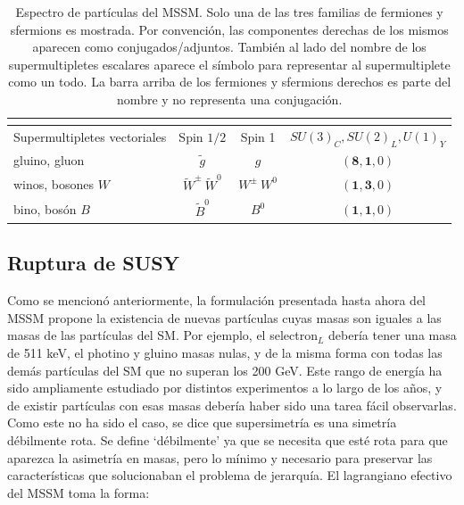 \begin{table}
\begin{tabular}{ l c | c c c}
		\multicolumn{5}{c}{} \\

		\hline

		\multicolumn{2}{l|}{Supermultipletes vectoriales} & Spin $1/2$ & Spin 1 & $SU(3)_C, SU(2)_L, U(1)_Y$ \\

		\hline

		\multicolumn{2}{l|}{gluino, gluon} & $\tilde{g}$ & $g$ & $(\textbf{8}, \textbf{1}, 0)$ \\

		\hline

		\multicolumn{2}{l|}{winos, bosones $W$} & $\widetilde{W}^{\pm}\ \widetilde{W}^{0}$ & $W^{\pm}\ W^0$ & $(\textbf{1}, \textbf{3}, 0)$ \\

		\hline

		\multicolumn{2}{l|}{bino, bosón $B$} & $\widetilde{B}^0$ & $B^0$ & $(\textbf{1}, \textbf{1}, 0)$ \\

	\end{tabular}

	\caption{Espectro de partículas del MSSM. Solo una de las tres familias de fermiones y sfermions es mostrada. Por convención, las componentes derechas de los mismos aparecen como conjugados/adjuntos. También al lado del nombre de los supermultipletes escalares aparece el símbolo para representar al supermultiplete como un todo. La barra arriba de los fermiones y sfermions derechos es parte del nombre y no representa una conjugación. 
	}
	\label{tab:mssm_particles}

\end{table}


\subsection{Ruptura de SUSY}

Como se mencionó anteriormente, la formulación presentada hasta ahora del MSSM propone la existencia de nuevas partículas cuyas masas son iguales a las masas de las partículas del SM. Por ejemplo, el selectron$_L$ debería tener una masa de 511 keV, el photino y gluino masas nulas, y de la misma forma con todas las demás partículas del SM que no superan los 200 GeV. Este rango de energía ha sido ampliamente estudiado por distintos experimentos a lo largo de los años, y de existir partículas con esas masas debería haber sido una tarea fácil observarlas. Como este no ha sido el caso, se dice que supersimetría es una simetría débilmente rota. Se define `débilmente' ya que se necesita que esté rota para que aparezca la asimetría en masas, pero lo mínimo y necesario para preservar las características que solucionaban el problema de jerarquía. El lagrangiano efectivo del MSSM toma la forma:

